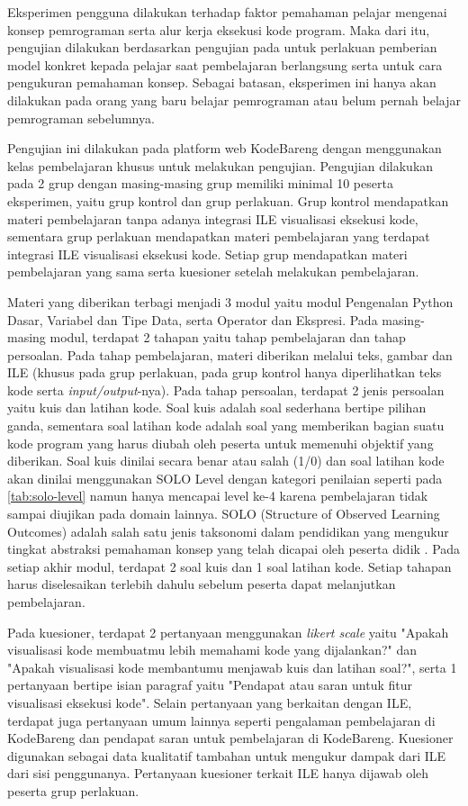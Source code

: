 Eksperimen pengguna dilakukan terhadap faktor pemahaman pelajar mengenai konsep pemrograman serta alur kerja eksekusi kode program. Maka dari itu, pengujian dilakukan berdasarkan pengujian pada \textcite{mayer1981psychology} untuk perlakuan pemberian model konkret kepada pelajar saat pembelajaran berlangsung serta \textcite{moons2013pilot} untuk cara pengukuran pemahaman konsep. Sebagai batasan, eksperimen ini hanya akan dilakukan pada orang yang baru belajar pemrograman atau belum pernah belajar pemrograman sebelumnya.

Pengujian ini dilakukan pada platform web KodeBareng dengan menggunakan kelas pembelajaran khusus untuk melakukan pengujian. Pengujian dilakukan pada 2 grup dengan masing-masing grup memiliki minimal 10 peserta eksperimen, yaitu grup kontrol dan grup perlakuan. Grup kontrol mendapatkan materi pembelajaran tanpa adanya integrasi ILE visualisasi eksekusi kode, sementara grup perlakuan mendapatkan materi pembelajaran yang terdapat integrasi ILE visualisasi eksekusi kode. Setiap grup mendapatkan materi pembelajaran yang sama serta kuesioner setelah melakukan pembelajaran.

Materi yang diberikan terbagi menjadi 3 modul yaitu modul Pengenalan Python Dasar, Variabel dan Tipe Data, serta Operator dan Ekspresi. Pada masing-masing modul, terdapat 2 tahapan yaitu tahap pembelajaran dan tahap persoalan. Pada tahap pembelajaran, materi diberikan melalui teks, gambar dan ILE (khusus pada grup perlakuan, pada grup kontrol hanya diperlihatkan teks kode serta \textit{input/output}-nya). Pada tahap persoalan, terdapat 2 jenis persoalan yaitu kuis dan latihan kode. Soal kuis adalah soal sederhana bertipe pilihan ganda, sementara soal latihan kode adalah soal yang memberikan bagian suatu kode program yang harus diubah oleh peserta untuk memenuhi objektif yang diberikan. Soal kuis dinilai secara benar atau salah (1/0) dan soal latihan kode akan dinilai menggunakan SOLO Level dengan kategori penilaian seperti pada \autoref{tab:solo-level} namun hanya mencapai level ke-4 karena pembelajaran tidak sampai diujikan pada domain lainnya. SOLO (Structure of Observed Learning Outcomes) adalah salah satu jenis taksonomi dalam pendidikan yang mengukur tingkat abstraksi pemahaman konsep yang telah dicapai oleh peserta didik \parencite{moons2013pilot}. Pada setiap akhir modul, terdapat 2 soal kuis dan 1 soal latihan kode. Setiap tahapan harus diselesaikan terlebih dahulu sebelum peserta dapat melanjutkan pembelajaran.

Pada kuesioner, terdapat 2 pertanyaan menggunakan \textit{likert scale} yaitu "Apakah visualisasi kode membuatmu lebih memahami kode yang dijalankan?" dan "Apakah visualisasi kode membantumu menjawab kuis dan latihan soal?", serta 1 pertanyaan bertipe isian paragraf yaitu "Pendapat atau saran untuk fitur visualisasi eksekusi kode". Selain pertanyaan yang berkaitan dengan ILE, terdapat juga pertanyaan umum lainnya seperti pengalaman pembelajaran di KodeBareng dan pendapat saran untuk pembelajaran di KodeBareng. Kuesioner digunakan sebagai data kualitatif tambahan untuk mengukur dampak dari ILE dari sisi penggunanya. Pertanyaan kuesioner terkait ILE hanya dijawab oleh peserta grup perlakuan.

